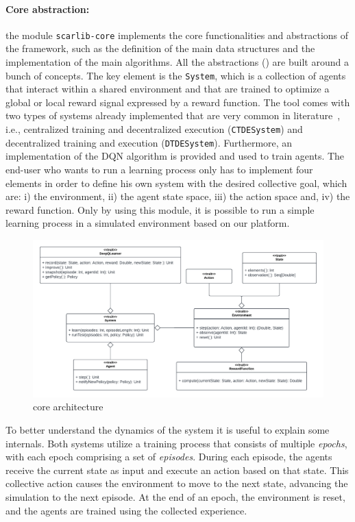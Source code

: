 \paragraph{Core abstraction:} the module \texttt{scarlib-core} implements the core functionalities and abstractions of the framework, such as the definition of the main data structures and the implementation of the main algorithms. 
%
All the abstractions () are built around a bunch of concepts. The key element is the \texttt{System}, which is a collection of agents that interact within a shared environment and that are trained to optimize a global or local reward signal
expressed by a reward function. 
%
The tool comes with two types of systems already implemented that are very common in literature~\cite{Du2020},
i.e., centralized training and decentralized execution (\texttt{CTDESystem}) and decentralized training and execution (\texttt{DTDESystem}).
Furthermore, an implementation of the DQN algorithm \cite{Mnih2015} is provided and used to train agents. 
The end-user who wants to run a learning process only has to implement four elements
in order to define his own system with the desired collective goal, which are: 
 i) the environment, 
 ii) the agent state space, 
 iii) the action space and,
 iv) the reward function.
Only by using this module, 
 it is possible to run a simple learning process in a simulated environment based on our platform.

\begin{figure}[t]
    \centering
    \includegraphics[width=\textwidth]{papers/coordination2023/imgs/core-architecture.pdf}
    \caption{\scarlib{} core architecture}
    \label{fig:arc}
\end{figure} %

To better understand the dynamics of the system it is useful to explain some internals.
%
Both systems utilize a training process that consists of multiple \emph{epochs}, 
 with each epoch comprising a set of \emph{episodes}. 
 During each episode, 
 the agents receive the current state as input and 
 execute an action based on that state. 
This collective action causes 
 the environment to move to the next state, 
 advancing the simulation to the next episode.
At the end of an epoch, 
 the environment is reset, and the agents are trained using the collected experience.

